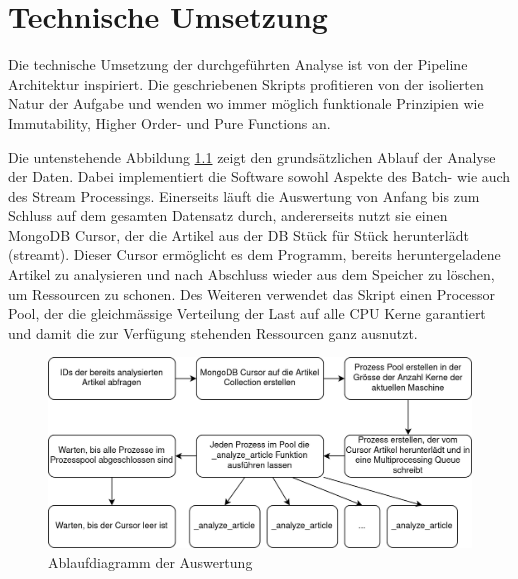 \chapter{Technische Umsetzung}

Die technische Umsetzung der durchgeführten Analyse ist von der
Pipeline Architektur inspiriert. Die geschriebenen Skripts profitieren
von der isolierten Natur der Aufgabe und wenden wo immer möglich
funktionale Prinzipien wie Immutability, Higher Order- und Pure Functions
an.

Die untenstehende Abbildung \ref{flowchart-aggregation} zeigt den
grundsätzlichen Ablauf der Analyse der Daten. Dabei implementiert
die Software sowohl Aspekte des Batch- wie auch des Stream Processings.
Einerseits läuft die Auswertung von Anfang bis zum Schluss auf dem gesamten
Datensatz durch, andererseits nutzt sie einen MongoDB Cursor, der die
Artikel aus der DB Stück für Stück herunterlädt (streamt). Dieser Cursor ermöglicht
es dem Programm, bereits heruntergeladene Artikel zu analysieren und nach
Abschluss wieder aus dem Speicher zu löschen, um Ressourcen zu schonen.
Des Weiteren verwendet das Skript einen Processor Pool, der die gleichmässige
Verteilung der Last auf alle CPU Kerne garantiert und damit die zur Verfügung
stehenden Ressourcen ganz ausnutzt.

\begin{figure}[H]
	\begin{center}
        \centering
		\includegraphics[width=1\linewidth]{./images/aggregate.png}
	\end{center}
	\caption{Ablaufdiagramm der Auswertung}
	\label{flowchart-aggregation}
\end{figure}

